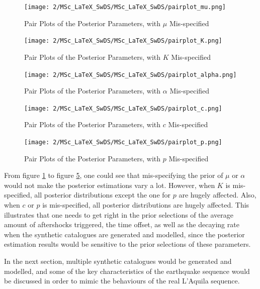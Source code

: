 \documentclass[11pt,twoside]{article}
\numberwithin{Theorem}{section}
\numberwithin{Definition}{section}
\numberwithin{Lemma}{section}
\numberwithin{Algorithm}{section}
\numberwithin{equation}{section}
\begin{document}
\begin{figure}[h]
\centering
\texttt{[image: 2/MSc\_LaTeX\_SwDS/MSc\_LaTeX\_SwDS/pairplot\_mu.png]}
\caption{Pair Plots of the Posterior Parameters, with $\mu$ Mis-specified}
\label{fig:pair_mu}
\end{figure}

\begin{figure}[h]
\centering
\texttt{[image: 2/MSc\_LaTeX\_SwDS/MSc\_LaTeX\_SwDS/pairplot\_K.png]}
\caption{Pair Plots of the Posterior Parameters, with $K$ Mis-specified}
\label{fig:pair_K}
\end{figure}

\begin{figure}[h]
\centering
\texttt{[image: 2/MSc\_LaTeX\_SwDS/MSc\_LaTeX\_SwDS/pairplot\_alpha.png]}
\caption{Pair Plots of the Posterior Parameters, with $\alpha$ Mis-specified}
\label{fig:pair_alpha}
\end{figure}

\begin{figure}[h]
\centering
\texttt{[image: 2/MSc\_LaTeX\_SwDS/MSc\_LaTeX\_SwDS/pairplot\_c.png]}
\caption{Pair Plots of the Posterior Parameters, with $c$ Mis-specified}
\label{fig:pair_c}
\end{figure}

\begin{figure}[h]
\centering
\texttt{[image: 2/MSc\_LaTeX\_SwDS/MSc\_LaTeX\_SwDS/pairplot\_p.png]}
\caption{Pair Plots of the Posterior Parameters, with $p$ Mis-specified}
\label{fig:pair_p}
\end{figure}
\clearpage
From figure \ref{fig:pair_mu} to figure \ref{fig:pair_p}, one could see that mis-specifying the prior of $\mu$ or $\alpha$ would not make the posterior estimations vary a lot. However, when $K$ is mis-specified, all posterior distributions except the one for $p$ are hugely affected. Also, when $c$ or $p$ is mis-specified, all posterior distributions are hugely affected. This illustrates that one needs to get right in the prior selections of the average amount of aftershocks triggered, the time offset, as well as the decaying rate when the synthetic catalogues are generated and modelled, since the posterior estimation results would be sensitive to the prior selections of these parameters.
 
In the next section, multiple synthetic catalogues would be generated and modelled, and some of the key characteristics of the earthquake sequence would be discussed in order to mimic the behaviours of the real L'Aquila sequence.
\end{document}
